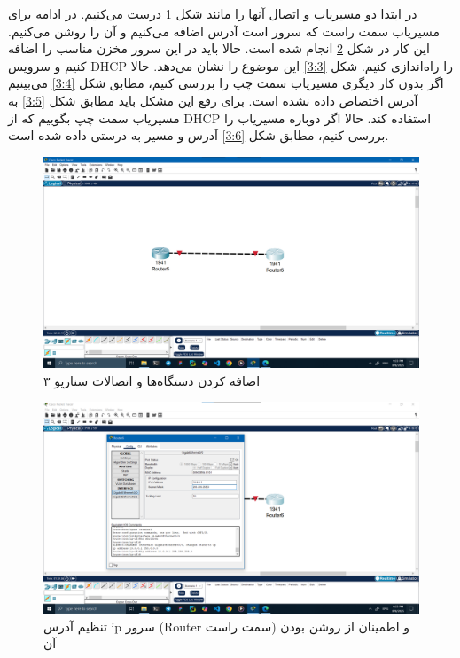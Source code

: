 \documentclass[12pt]{article}
\begin{document}
	در ابتدا دو مسیریاب و اتصال آنها را مانند شکل \ref{3:1} درست می‌کنیم. در ادامه برای مسیر‌یاب سمت راست که سرور است آدرس اضافه می‌کنیم و آن را روشن می‌کنیم. این کار در شکل \ref{3:2} انجام شده است. حالا باید در این سرور مخزن مناسب را اضافه کنیم و سرویس \textenglish{DHCP} را راه‌اندازی کنیم. شکل \ref{3:3} این موضوع را نشان‌ می‌دهد. حالا اگر بدون کار دیگری مسیریاب سمت چپ را بررسی کنیم، مطابق شکل \ref{3:4} می‌بینیم آدرس اختصاص داده نشده است. برای رفع این مشکل باید مطابق شکل \ref{3:5} به مسیریاب سمت چپ بگوییم که از \textenglish{DHCP} استفاده کند. حالا اگر دوباره مسیریاب را بررسی کنیم، مطابق شکل \ref{3:6} آدرس و مسیر به درستی داده شده است.
	\begin{figure}[H]
		\centering
		\includegraphics[width=\textwidth]{resources/scenario3-1.png}
		\caption{اضافه کردن دستگاه‌ها و اتصالات سناریو ۳}
		\label{3:1}
	\end{figure}
	\begin{figure}[H]
		\centering
		\includegraphics[width=\textwidth]{resources/scenario3-2.png}
		\caption{تنظیم آدرس \textenglish{ip} سرور (\textenglish{Router} سمت راست) و اطمینان از روشن بودن آن}
		\label{3:2}
	\end{figure}
\end{document}

